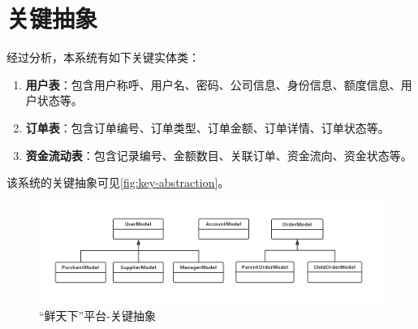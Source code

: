 \section{关键抽象}

经过分析，本系统有如下关键实体类：

\begin{enumerate}
    \item \textbf{用户表}：包含用户称呼、用户名、密码、公司信息、身份信息、额度信息、用户状态等。
    \item \textbf{订单表}：包含订单编号、订单类型、订单金额、订单详情、订单状态等。
    \item \textbf{资金流动表}：包含记录编号、金额数目、关联订单、资金流向、资金状态等。
\end{enumerate}


该系统的关键抽象可见\autoref{fig:key-abstraction}。

\begin{figure}[htp]
    \centering
    \includegraphics[width=15cm]{figure/key-abstraction.png}
    \caption{“鲜天下”平台-关键抽象}
    \label{fig:key-abstraction}
\end{figure}
